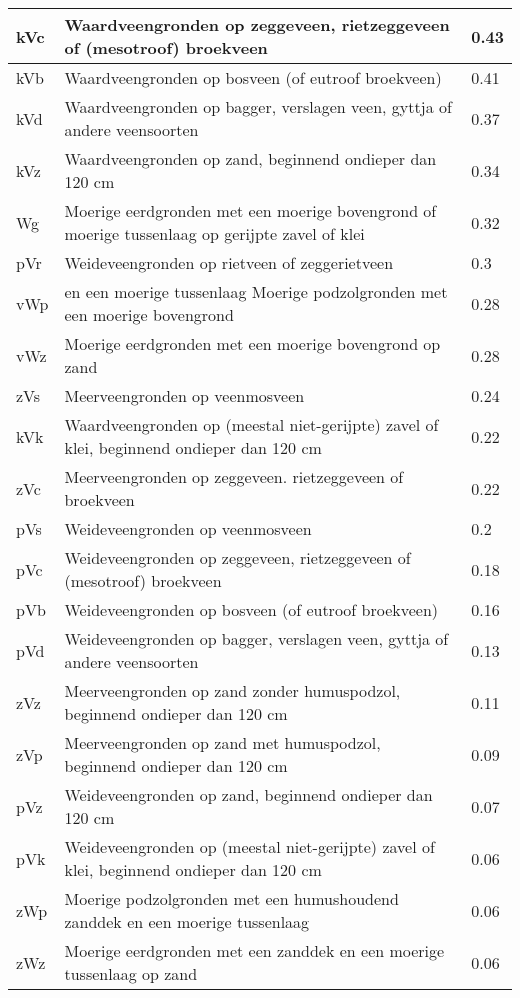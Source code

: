 \documentclass[12pt,a4paper,titlepage]{article}
\begin{document}
\begin{appendices}
\begin{center}
\begin{longtable}{|l| p{11cm} | l |}
kVc & Waardveengronden op zeggeveen, rietzeggeveen of (mesotroof) broekveen  & 0.43 \\ \hline
kVb & Waardveengronden op bosveen (of eutroof broekveen) & 0.41 \\ \hline
kVd & Waardveengronden op bagger, verslagen veen, gyttja of andere veensoorten  & 0.37 \\ \hline
kVz & Waardveengronden op zand, beginnend ondieper dan 120 cm  & 0.34 \\ \hline
Wg & Moerige eerdgronden met een moerige bovengrond of  moerige tussenlaag op gerijpte zavel of klei  & 0.32 \\ \hline
pVr & Weideveengronden op rietveen of zeggerietveen  & 0.3 \\ \hline
vWp & en een moerige tussenlaag Moerige podzolgronden met een moerige bovengrond  & 0.28 \\ \hline
vWz & Moerige eerdgronden met een moerige bovengrond op zand  & 0.28 \\ \hline
zVs & Meerveengronden op veenmosveen  & 0.24 \\ \hline
kVk & Waardveengronden op (meestal niet-gerijpte) zavel of klei, beginnend ondieper dan 120 cm  & 0.22 \\ \hline
zVc & Meerveengronden op zeggeveen. rietzeggeveen of broekveen  & 0.22 \\ \hline
pVs & Weideveengronden op veenmosveen  & 0.2 \\ \hline
pVc & Weideveengronden op zeggeveen, rietzeggeveen of (mesotroof) broekveen  & 0.18 \\ \hline
pVb & Weideveengronden op bosveen (of eutroof broekveen)  & 0.16 \\ \hline
pVd & Weideveengronden op bagger, verslagen veen, gyttja of andere veensoorten & 0.13 \\ \hline
zVz & Meerveengronden op zand zonder humuspodzol, beginnend ondieper dan 120 cm & 0.11 \\ \hline
zVp & Meerveengronden op zand met humuspodzol, beginnend ondieper dan 120 cm & 0.09 \\ \hline
pVz & Weideveengronden op zand, beginnend ondieper dan 120 cm  & 0.07 \\ \hline
pVk & Weideveengronden op (meestal niet-gerijpte) zavel of klei, beginnend ondieper dan 120 cm  & 0.06 \\ \hline
zWp & Moerige podzolgronden met een humushoudend zanddek en een moerige tussenlaag  & 0.06 \\ \hline
zWz & Moerige eerdgronden met een zanddek en een moerige tussenlaag op zand  & 0.06 \\ \hline

\end{longtable}
\end{center}
\end{appendices}
\end{document}
